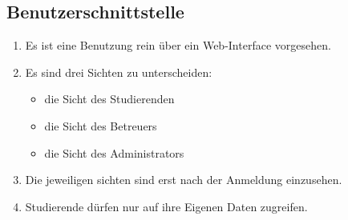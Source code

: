 \documentclass[parskip=full]{scrartcl}
\begin{document}
\subsection{Benutzerschnittstelle}
\begin{enumerate}
  \item Es ist eine Benutzung rein über ein Web-Interface vorgesehen.
  \item Es sind drei Sichten zu unterscheiden:
        \begin{itemize}
          \item die Sicht des Studierenden
          \item die Sicht des Betreuers
          \item die Sicht des Administrators
        \end{itemize}
  \item Die jeweiligen sichten sind erst nach der Anmeldung einzusehen. 
  \item Studierende dürfen nur auf ihre Eigenen Daten zugreifen.
  
\end{enumerate}
\pagebreak
\printglossaries
\end{document}
